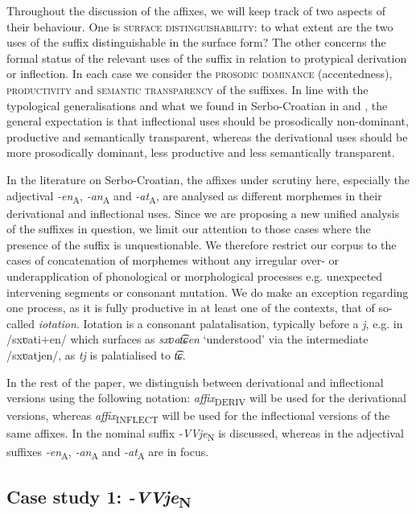 \documentclass[output=paper]{langsci/langscibook}
\begin{document}
Throughout the discussion of the affixes, we will keep track of two aspects of their behaviour. One is \textsc{surface distinguishability}: to what extent are the two uses of the suffix distinguishable in the surface form? The other concerns the formal status of the relevant uses of the suffix in relation to protypical derivation or inflection. In each case we consider the \textsc{prosodic dominance} (accentedness), \textsc{productivity} and \textsc{semantic transparency} of the suffixes. In line with the typological generalisations and what we found in Serbo-Croatian in \citet{Arsim2013} and \citet{Sim2014}, the general expectation is that inflectional uses should be prosodically non-dominant, productive and semantically transparent, whereas the derivational uses should be more prosodically dominant, less productive and less semantically transparent.

In the literature on Serbo-Croatian, the affixes under scrutiny here, especially the adjectival \textit{-en}\textsubscript{A}, \textit{-an}\textsubscript{A} and  \textit{-at}\textsubscript{A}, are analysed as different morphemes in their derivational and inflectional uses. Since we are proposing a new unified analysis of the suffixes in question, we limit our attention to those cases where the presence of the suffix is unquestionable. We therefore restrict our corpus to the cases of concatenation of morphemes without any irregular over- or underapplication of phonological or morphological processes e.g. unexpected intervening segments or consonant mutation. We do make an exception regarding one process, as it is fully productive in at least one of the contexts, that of so-called \textit{iotation}. Iotation is a consonant palatalisation, typically before a \textit{j}, e.g. in /sxʋati+en/ which surfaces as \textit{sxʋat͡ɕen} `understood' via the intermediate /sxʋatjen/, as \textit{tj} is palatialised to \textit{t͡ɕ}. 

In the rest of the paper, we distinguish between derivational and inflectional versions using the following notation: \textit{affix}\textsubscript{DERIV} will be used for the derivational versions, whereas \textit{affix}\textsubscript{INFLECT} will be used for the inflectional versions of the same affixes.
In  the nominal suffix \textit{-VVje}\textsubscript{N} is discussed, whereas in   the adjectival suffixes \textit{{-en}}\textsubscript{A}, \textit{{-an}}\textsubscript{A} and \textit{{-at}}\textsubscript{A} are in focus.
\subsection{Case study 1: \textit{-VVje}\textsubscript{N}}\label{sec:simonovic:41}
\end{document}

